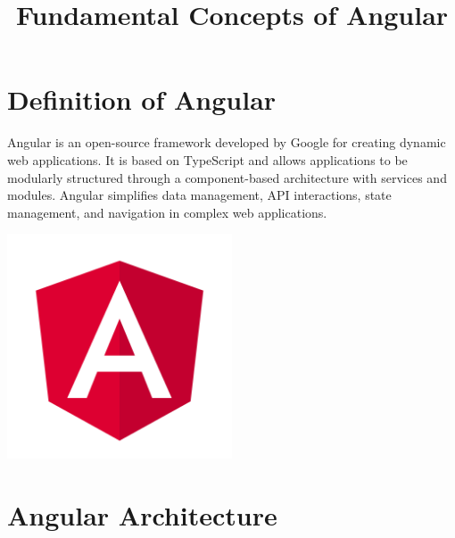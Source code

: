 \documentclass{article}
\title{Fundamental Concepts of Angular}
\author{}
\date{}
\begin{document}
\maketitle

\section*{Definition of Angular}

Angular is an open-source framework developed by Google for creating dynamic web applications. It is based on TypeScript and allows applications to be modularly structured through a component-based architecture with services and modules. Angular simplifies data management, API interactions, state management, and navigation in complex web applications.

\begin{tcolorbox}[colframe=black!70, colback=white, title=Figure 1: Angular Logo, fonttitle=\bfseries]
\centering
\includegraphics[width=0.5\textwidth]{images/Angular_full_color_logo.svg.png}
\end{tcolorbox}

\section*{Angular Architecture}
\end{document}
